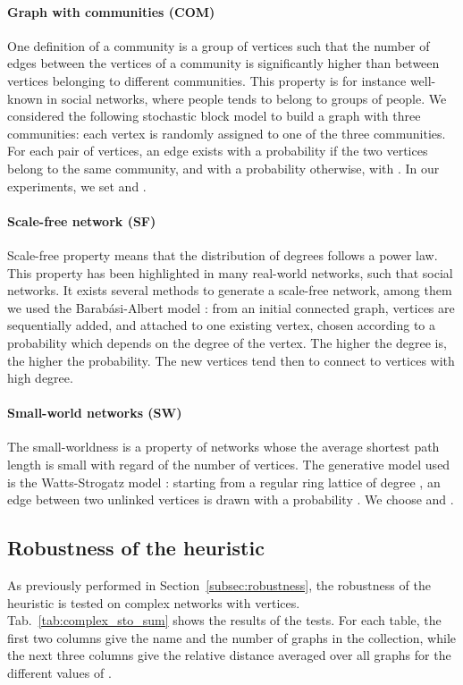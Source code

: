 \documentclass{scrartcl}
\theoremstyle{plain}
\begin{document}
\paragraph{Graph with communities (COM)}
One definition of a community is a group of vertices such that the number of 
edges between the vertices of a community is significantly higher than between 
vertices belonging to different communities. This property is for instance 
well-known in social networks, where people tends to belong to groups of people. 
We considered the following stochastic block model to build a graph with three 
communities: each vertex is randomly assigned to one of the three communities. 
For each pair of vertices, an edge exists with a probability  
if the two vertices belong to the same community, and with a probability 
 otherwise, with . In our 
experiments, we set  and .

\paragraph{Scale-free network (SF)} 
Scale-free property means that the distribution of degrees follows a power law. 
This property has been highlighted in many real-world networks, such that social 
networks. It exists several methods to generate a scale-free network, among them 
we used the Barab\'asi-Albert model \cite{Albert2002}: from an initial connected 
graph, vertices are sequentially added, and attached to one existing vertex, 
chosen according to a probability which depends on the degree of the vertex. The 
higher the degree is, the higher the probability. The new vertices tend then to 
connect to vertices with high degree.

\paragraph{Small-world networks (SW)} 
The small-worldness is a property of networks whose the average shortest path 
length is small with regard of the number of vertices. The generative model used 
is the Watts-Strogatz model \cite{Watts1998}: starting from a regular ring 
lattice of degree , an edge between two unlinked vertices is drawn with a 
probability . We choose  and .


\subsection{Robustness of the heuristic}

As previously performed in Section~\ref{subsec:robustness}, the robustness of 
the heuristic is tested on complex networks with  vertices. 
Tab.~\ref{tab:complex_sto_sum} shows the results of the tests. For each table, 
the first two columns give the name and the number of graphs in the collection, 
while the next three columns give the relative distance averaged over all 
graphs 
for the different values of .
\end{document}
